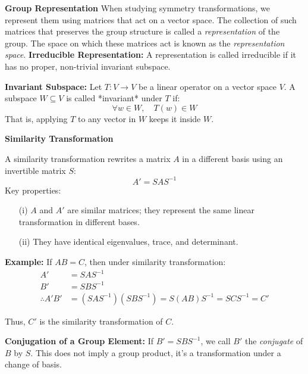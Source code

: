 \documentclass[14pt]{article} %
\begin{document}
\begin{tcolorbox}[proofbox, title=\textbf{Notes:}]
\textbf{Group Representation}
\vspace{0.1cm}
\newline
When studying symmetry transformations, we represent them using matrices that act on a vector space.  
The collection of such matrices that preserves the group structure is called a \textit{representation} of the group.  
The space on which these matrices act is known as the \textit{representation space}.
\vspace{0.1cm}
\newline
\textbf{Irreducible Representation:}  
A representation is called irreducible if it has no proper, non-trivial invariant subspace.

\vspace{0.1cm}
\textbf{Invariant Subspace:}  
Let $T: V \rightarrow V$ be a linear operator on a vector space $V$. A subspace $W \subseteq V$ is called *invariant* under $T$ if:
\[
\forall w \in W,\quad T(w) \in W
\]
That is, applying $T$ to any vector in $W$ keeps it inside $W$.

\vspace{0.3cm}
\textbf{Similarity Transformation}

A similarity transformation rewrites a matrix $A$ in a different basis using an invertible matrix $S$:
\[
A' = S A S^{-1}
\]
Key properties:
\begin{itemize}
    \item[(i)] $A$ and $A'$ are similar matrices; they represent the same linear transformation in different bases.
    \item[(ii)] They have identical eigenvalues, trace, and determinant.
\end{itemize}

\textbf{Example:} If $AB = C$, then under similarity transformation:
\begin{align*}
A'& =SAS^{-1} \\
B' &= SBS^{-1} \\
    \therefore A'B' &= (SAS^{-1})(SBS^{-1}) = S(AB)S^{-1} = SCS^{-1} = C'
\end{align*}

Thus, $C'$ is the similarity transformation of $C$.
\vspace{0.3cm}

\textbf{Conjugation of a Group Element:}
\newline
If $B' = SBS^{-1}$, we call $B'$ the \textit{conjugate} of $B$ by $S$.
This does not imply a group product, it’s a transformation under a change of basis.
\end{tcolorbox}
\end{document}
